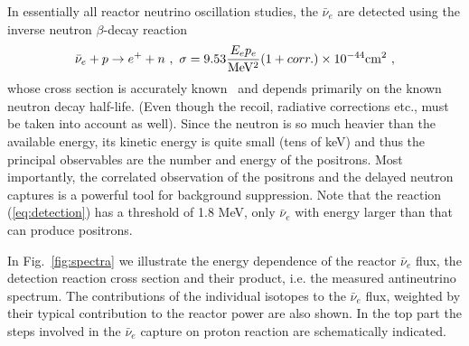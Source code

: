 \documentclass[aps,twocolumn,preprintnumbers,amsmath,superscriptaddress,amssymb,floats,nofootinbib]{revtex4-1}
\begin{document}
In essentially all reactor neutrino oscillation studies, the $\bar{\nu}_e$ are detected using the inverse neutron $\beta$-decay reaction
\begin{equation}
\bar{\nu}_e + p \rightarrow e^+ + n~, \\ ~ \sigma = 9.53 \frac{E_e p_e}{ {\rm MeV^2}} (1 + corr.) \times 10^{-44} {\rm cm^2} ~,
\label{eq:detection}
\end{equation}
whose cross section is accurately known~\cite{VB99, Strumia} and depends primarily on the known neutron decay half-life. (Even though the recoil, radiative
corrections etc., must be taken into account as well). Since the neutron is so much heavier than the available energy, its kinetic energy is quite
small (tens of keV) and thus the principal observables are the number and energy of the positrons. Most importantly, the correlated observation of the
positrons and the delayed neutron captures is a powerful tool for background suppression. Note that the reaction (\ref{eq:detection}) has
a threshold of 1.8 MeV, only $\bar{\nu}_e$ with energy larger than that can produce positrons. 

In Fig.~\ref{fig:spectra} we illustrate the energy dependence of the reactor $\bar{\nu}_e$ flux, the detection reaction cross section and their product,
i.e. the measured antineutrino spectrum. The contributions of the individual isotopes to the $\bar{\nu}_e$ flux, weighted by their typical contribution
to the reactor power are also shown. In the top part the steps involved in the $\bar{\nu}_e$ capture on proton reaction are schematically indicated. 


\onecolumngrid
\vspace{12pt}
\fboxsep=12pt
\end{document}
